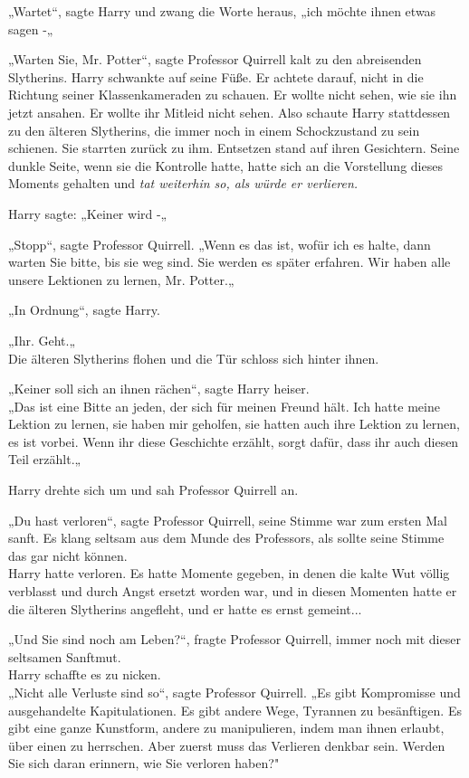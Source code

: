 {„Wartet“, sagte Harry und zwang die Worte heraus, „ich möchte ihnen etwas sagen -„

„Warten Sie, Mr. Potter“, sagte Professor Quirrell kalt zu den abreisenden Slytherins. Harry schwankte auf seine Füße. Er achtete darauf, nicht in die Richtung seiner Klassenkameraden zu schauen. Er wollte nicht sehen, wie sie ihn jetzt ansahen. Er wollte ihr Mitleid nicht sehen. Also schaute Harry stattdessen zu den älteren Slytherins, die immer noch in einem Schockzustand zu sein schienen. Sie starrten zurück zu ihm. Entsetzen stand auf ihren Gesichtern. Seine dunkle Seite, wenn sie die Kontrolle hatte, hatte sich an die Vorstellung dieses Moments gehalten und \emph{tat weiterhin so, als würde er verlieren.}

Harry sagte: „Keiner wird -„

„Stopp“, sagte Professor Quirrell. „Wenn es das ist, wofür ich es halte, dann warten Sie bitte, bis sie weg sind. Sie werden es später erfahren. Wir haben alle unsere Lektionen zu lernen, Mr. Potter.„

„In Ordnung“, sagte Harry.

„Ihr. Geht.„\\ Die älteren Slytherins flohen und die Tür schloss sich hinter ihnen.

„Keiner soll sich an ihnen rächen“, sagte Harry heiser.\\ „Das ist eine Bitte an jeden, der sich für meinen Freund hält. Ich hatte meine Lektion zu lernen, sie haben mir geholfen, sie hatten auch ihre Lektion zu lernen, es ist vorbei. Wenn ihr diese Geschichte erzählt, sorgt dafür, dass ihr auch diesen Teil erzählt.„

Harry drehte sich um und sah Professor Quirrell an.

„Du hast verloren“, sagte Professor Quirrell, seine Stimme war zum ersten Mal sanft. Es klang seltsam aus dem Munde des Professors, als sollte seine Stimme das gar nicht können.\\ Harry hatte verloren. Es hatte Momente gegeben, in denen die kalte Wut völlig verblasst und durch Angst ersetzt worden war, und in diesen Momenten hatte er die älteren Slytherins angefleht, und er hatte es ernst gemeint...

„Und Sie sind noch am Leben?“, fragte Professor Quirrell, immer noch mit dieser seltsamen Sanftmut.\\ Harry schaffte es zu nicken.\\ „Nicht alle Verluste sind so“, sagte Professor Quirrell. „Es gibt Kompromisse und ausgehandelte Kapitulationen. Es gibt andere Wege, Tyrannen zu besänftigen. Es gibt eine ganze Kunstform, andere zu manipulieren, indem man ihnen erlaubt, über einen zu herrschen. Aber zuerst muss das Verlieren denkbar sein. Werden Sie sich daran erinnern, wie Sie verloren haben?"

}
